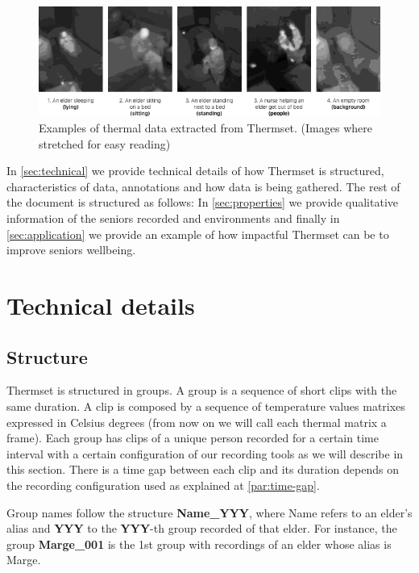 \documentclass[oneside, twocolumn]{article}
\begin{document}
\begin{figure}
  \centering
    \includegraphics[width=1.0\textwidth]{images/examples_auth}
  \caption{Examples of thermal data extracted from Thermset. (Images where stretched for easy reading)}
  \label{fig:examples}
\end{figure}



In \autoref{sec:technical} we provide technical details of how Thermset is structured, characteristics of data,
annotations and how data is being gathered. The rest of the document is structured as follows:
In \autoref{sec:properties} we provide qualitative information of the seniors recorded and environments and
finally in \autoref{sec:application} we provide an example of how impactful Thermset can be to improve seniors
wellbeing.


\section{Technical details}
\label{sec:technical}
\subsection{Structure}
Thermset is structured in groups. A group is a sequence of short clips with the same duration.
A clip is composed by a sequence of temperature values matrixes expressed in Celsius degrees
(from now on we will call each thermal matrix a frame). Each group has clips of a unique person
recorded for a certain time interval with a certain configuration of our recording tools as we will
describe in this section. There is a time gap between each clip and its duration depends on the recording
configuration used as explained at \autoref{par:time-gap}.

Group names follow the structure \textbf{Name\_YYY}, where Name refers to an elder's alias and \textbf{YYY}
to the \textbf{YYY}-th group recorded of that elder. For instance, the group \textbf{Marge\_001} is the
1st group with recordings of an elder whose alias is Marge.
\end{document}
